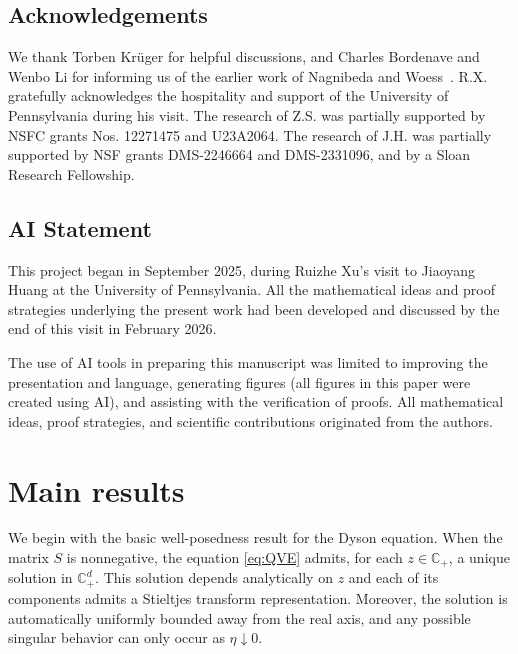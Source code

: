 \documentclass[11pt,twoside, a4paper]{article}
\numberwithin{equation}{section}
\numberwithin{figure}{section}
\theoremstyle{plain} %
\theoremstyle{definition}
\theoremstyle{remark}
\newcommand{\1} {\mspace{1 mu}}
\newcommand{\2} {\mspace{2 mu}}
\newcommand{\Cp} {\mathbb {C}_+}
\begin{document}
\subsection*{Acknowledgements}
We thank Torben Kr{\"u}ger for helpful discussions, and Charles Bordenave and Wenbo Li for informing us of the earlier work of Nagnibeda and Woess~\cite{random2002nagnibeda}. R.X. gratefully acknowledges the hospitality and support of the University of Pennsylvania during his visit. The research of Z.S. was partially supported by NSFC grants Nos. 12271475 and U23A2064. The research of J.H. was partially supported by NSF grants DMS-2246664 and DMS-2331096, and by a Sloan Research Fellowship.

\subsection*{AI Statement}
This project began in September 2025, during Ruizhe Xu's visit to Jiaoyang Huang at the University of Pennsylvania. All the mathematical ideas and proof strategies underlying the present work had been developed and discussed by the end of this visit in February 2026.


The use of AI tools in preparing this manuscript was limited to improving the presentation and language, generating figures (all figures in this paper were created using AI), and assisting with the verification of proofs. All mathematical ideas, proof strategies, and scientific contributions originated from the authors.

\section{Main results}\label{sec:main}

We begin with the basic well-posedness result for the Dyson equation. When the matrix $S$ is nonnegative, the equation \eqref{eq:QVE} admits, for each $z\in\Cp$, a unique solution in $\Cp^d$. This solution depends analytically on $z$ and each of its components admits a Stieltjes transform representation. Moreover, the solution is automatically uniformly bounded away from the real axis, and any possible singular behavior can only occur as \(\eta\downarrow0\).
\end{document}
